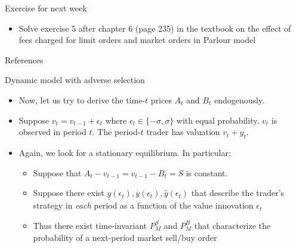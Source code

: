\documentclass[english,10pt
,aspectratio=169
]{beamer}
\begin{document}
\begin{frame}{Exercise for next week}
	\begin{itemize}
		\item Solve exercise 5 after chapter 6 (page 235) in the textbook on the effect of fees charged for limit orders and market orders in Parlour model
	\end{itemize}
\end{frame}





\appendix
\begin{frame}[allowframebreaks]{References}


\end{frame}


\begin{frame}[label=adverse]{Dynamic model with adverse selection}
	\begin{itemize}
		\item Now, let us try to derive the time-$t$ prices $A_t$ and $B_t$ endogenously. 
		\item Suppose $v_t=v_{t-1}+\epsilon_t$ where $\epsilon_t \in \{-\sigma, \sigma \}$ with equal probability. $v_t$ is observed in period $t$. The period-$t$ trader has valuation $v_t+y_t$. 
		\item Again, we look for a stationary equilibrium. In particular:
		\begin{itemize}
			\item Suppose that $A_t-v_{t-1}=v_{t-1}-B_t=S$ is constant.
			\item Suppose there exist $\underline{y}(\epsilon_t),\overline{y}(\epsilon_t),\hat{y}(\epsilon_t)$  that describe the trader's strategy in \textit{each} period  as a function of the value innovation $\epsilon_t$ 
			\item Thus there exist time-invariant $P^S_M$ and $P^B_M$ that characterize the probability of a next-period market sell/buy order 
		\end{itemize}
	\end{itemize}
\end{frame}
\end{document}
